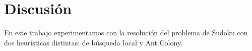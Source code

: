 \documentclass[a4paper,spanish]{article}
\begin{document}
% 
% 
% 
% 
% 
% 
% 
% 
% 
% 

\section{Discusión}

En este trabajo experimentamos con la resolución del problema de Sudoku con dos
heurísticas distintas: de búsqueda local y Ant Colony.
\end{document}
